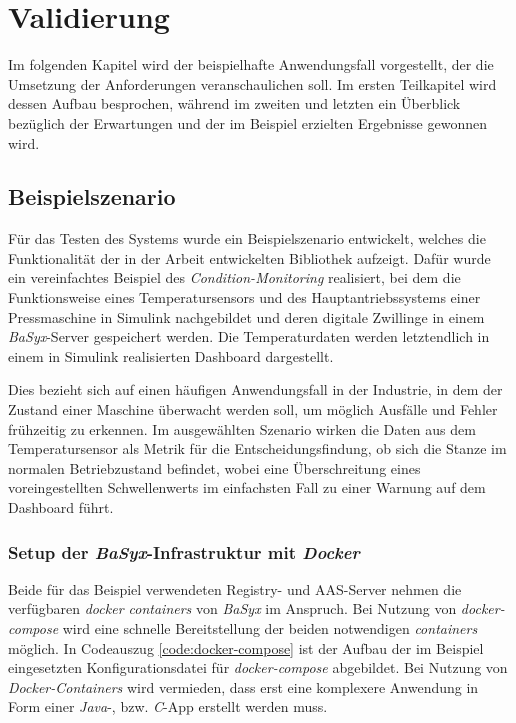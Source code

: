 \chapter{Validierung} \label{validierung}

Im folgenden Kapitel wird der beispielhafte Anwendungsfall vorgestellt, der die Umsetzung der Anforderungen veranschaulichen soll. Im ersten Teilkapitel wird dessen Aufbau besprochen, während im zweiten und letzten ein Überblick bezüglich der Erwartungen und der im Beispiel erzielten Ergebnisse gewonnen wird. 

\section{Beispielszenario}

Für das Testen des Systems wurde ein Beispielszenario entwickelt, welches die Funktionalität der in der Arbeit entwickelten Bibliothek aufzeigt. Dafür wurde ein vereinfachtes Beispiel des \textit{Condition-Monitoring} realisiert, bei dem die Funktionsweise eines Temperatursensors und des Hauptantriebssystems einer Pressmaschine in Simulink nachgebildet und deren digitale Zwillinge in einem \textit{BaSyx}-Server gespeichert werden. Die Temperaturdaten werden letztendlich in einem in Simulink realisierten Dashboard dargestellt.

Dies bezieht sich auf einen häufigen Anwendungsfall in der Industrie, in dem der Zustand einer Maschine überwacht werden soll, um möglich Ausfälle und Fehler frühzeitig zu erkennen. Im ausgewählten Szenario wirken die Daten aus dem Temperatursensor als Metrik für die Entscheidungsfindung, ob sich die Stanze im normalen Betriebzustand befindet, wobei eine Überschreitung eines voreingestellten Schwellenwerts im einfachsten Fall zu einer Warnung auf dem Dashboard führt. 


\subsection{Setup der \textit{BaSyx}-Infrastruktur mit \textit{Docker}}

Beide für das Beispiel verwendeten Registry- und AAS-Server nehmen die verfügbaren \textit{docker containers} von \textit{BaSyx} im Anspruch. Bei Nutzung von \textit{docker-compose} wird eine schnelle Bereitstellung der beiden notwendigen \textit{containers} möglich. In Codeauszug \ref{code:docker-compose} ist der Aufbau der im Beispiel eingesetzten Konfigurationsdatei für \textit{docker-compose} abgebildet. Bei Nutzung von \textit{Docker-Containers} wird vermieden, dass erst eine komplexere Anwendung in Form einer \textit{Java}-, bzw. \textit{C}-App erstellt werden muss. 

